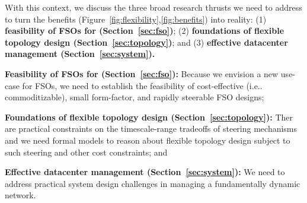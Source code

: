 

 With this context,  we discuss the three broad research thrusts we need to
address to turn the benefits (Figure~\ref{fig:flexibility},\ref{fig:benefits})
into reality: (1) {\bf feasibility of FSOs for \ArchName
(Section~\ref{sec:fso})};  (2) {\bf foundations of flexible topology design
(Section~\ref{sec:topology})}; and (3) {\bf effective datacenter management
(Section~\ref{sec:system}).}


\eat
{
\begin{packeditemize}
\item {\bf Feasibility of FSOs for \ArchName (Section~\ref{sec:fso}):}
 Because we envision a new use-case for FSOs, we need to establish the
feasibility of cost-effective (i.e.. commoditizable), small form-factor, 
and rapidly steerable FSO designs;  

\item {\bf Foundations of flexible topology design (Section~\ref{sec:topology}):}
  Ther are  practical constraints on the timescale-range tradeoffs of 
 steering mechanisms and  we need formal models to reason about  flexible
topology design subject to such steering and other cost constraints; and

\item {\bf Effective datacenter management (Section~\ref{sec:system}):}
 We need to address practical system design challenges in managing a fundamentally
dynamic network. 

\end{packeditemize}
}



